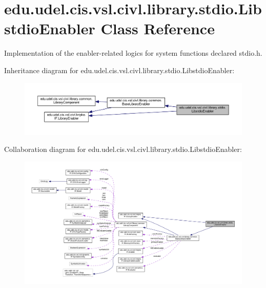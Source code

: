 \hypertarget{classedu_1_1udel_1_1cis_1_1vsl_1_1civl_1_1library_1_1stdio_1_1LibstdioEnabler}{}\section{edu.\+udel.\+cis.\+vsl.\+civl.\+library.\+stdio.\+Libstdio\+Enabler Class Reference}
\label{classedu_1_1udel_1_1cis_1_1vsl_1_1civl_1_1library_1_1stdio_1_1LibstdioEnabler}


Implementation of the enabler-\/related logics for system functions declared stdio.\+h.  




Inheritance diagram for edu.\+udel.\+cis.\+vsl.\+civl.\+library.\+stdio.\+Libstdio\+Enabler\+:
\nopagebreak
\begin{figure}[H]
\begin{center}
\leavevmode
\includegraphics[width=350pt]{classedu_1_1udel_1_1cis_1_1vsl_1_1civl_1_1library_1_1stdio_1_1LibstdioEnabler__inherit__graph}
\end{center}
\end{figure}


Collaboration diagram for edu.\+udel.\+cis.\+vsl.\+civl.\+library.\+stdio.\+Libstdio\+Enabler\+:
\nopagebreak
\begin{figure}[H]
\begin{center}
\leavevmode
\includegraphics[width=350pt]{classedu_1_1udel_1_1cis_1_1vsl_1_1civl_1_1library_1_1stdio_1_1LibstdioEnabler__coll__graph}
\end{center}
\end{figure}
